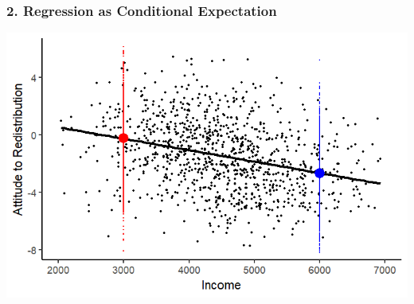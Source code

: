 \documentclass[xcolor=x11names,compress]{beamer}\usepackage[]{graphicx}\usepackage[]{color}
\makeatletter
\def\maxwidth{ %
  \ifdim\Gin@nat@width>\linewidth
    \linewidth
  \else
    \Gin@nat@width
  \fi
}
\newenvironment{knitrout}{}{} %
\renewcommand{\(}{\begin{columns}}
\renewcommand{\)}{\end{columns}}
\newcommand{\<}[1]{\begin{column}{#1}}
\renewcommand{\>}{\end{column}}
\makeatother
\begin{document}
\begin{frame}
\frametitle{2. Regression as Conditional Expectation}
\begin{knitrout}
\color{fgcolor}
\includegraphics[width=\maxwidth]{figure/cond_exp1b2-1} 

\end{knitrout}
\end{frame}
\end{document}
